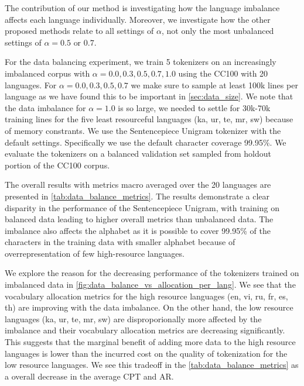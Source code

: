 The contribution of our method is investigating how the language imbalance affects each language individually. Moreover, we investigate how the other proposed methods relate to all settings of $\alpha$, not only the most unbalanced settings of $\alpha=0.5 \textrm{ or } 0.7$.

For the data balancing experiment, we train 5 tokenizers on an increasingly imbalanced corpus with $\alpha = 0.0, 0.3, 0.5, 0.7, 1.0$ using the CC100 with 20 languages. For $\alpha = 0.0, 0.3, 0.5, 0.7$ we make sure to sample at least 100k lines per language as we have found this to be important in \autoref{sec:data_size}. We note that the data imbalance for $\alpha=1.0$ is so large, we needed to settle for 30k-70k training lines for the five least resourceful languages (ka, ur, te, mr, sw) because of memory constrants. We use the Sentencepiece Unigram tokenizer with the default settings. Specifically we use the default character coverage 99.95\%. We evaluate the tokenizers on a balanced validation set sampled from holdout portion of the CC100 corpus. 

The overall results with metrics macro averaged over the 20 languages are presented in \autoref{tab:data_balance_metrics}. The results demonstrate a clear disparity in the performance of the Sentencepiece Unigram, with training on balanced data leading to higher overall metrics than unbalanced data. The imbalance also affects the alphabet as it is possible to cover 99.95\% of the characters in the training data with smaller alphabet because of overrepresentation of few high-resource languages.

We explore the reason for the decreasing performance of the tokenizers trained on imbalanced data in \autoref{fig:data_balance_vs_allocation_per_lang}. We see that the vocabulary allocation metrics for the high resource languages (en, vi, ru, fr, es, th) are improving with the data imbalance. On the other hand, the low resource languages (ka, ur, te, mr, sw) are disproporionally more affected by the imbalance and their vocabulary allocation metrics are decreasing significantly. This suggests that the marginal benefit of adding more data to the high resource languages is lower than the incurred cost on the quality of tokenization for the low resource languages. We see this tradeoff in the \autoref{tab:data_balance_metrics} as a overall decrease in the average CPT and AR.

